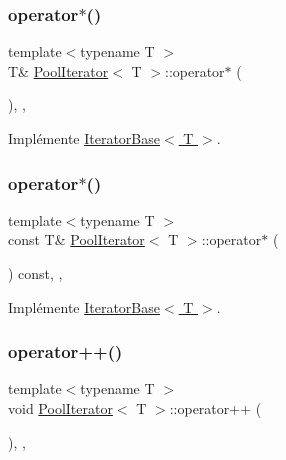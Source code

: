 \subsubsection{\texorpdfstring{operator$\ast$()}{operator*()}\hspace{0.1cm}{\footnotesize\ttfamily [1/2]}}
{\footnotesize\ttfamily template$<$typename T $>$ \\
T\& \hyperlink{class_pool_iterator}{Pool\+Iterator}$<$ T $>$\+::operator$\ast$ (\begin{DoxyParamCaption}{ }\end{DoxyParamCaption})\hspace{0.3cm}{\ttfamily [inline]}, {\ttfamily [override]}, {\ttfamily [virtual]}}



Implémente \hyperlink{class_iterator_base_a532583e58bce168648bdbdedb3a7d5ab}{Iterator\+Base$<$ T $>$}.

\mbox{\label{class_pool_iterator_ab8a7e0669bfd1cd4335ca726bba77127}} 
\subsubsection{\texorpdfstring{operator$\ast$()}{operator*()}\hspace{0.1cm}{\footnotesize\ttfamily [2/2]}}
{\footnotesize\ttfamily template$<$typename T $>$ \\
const T\& \hyperlink{class_pool_iterator}{Pool\+Iterator}$<$ T $>$\+::operator$\ast$ (\begin{DoxyParamCaption}{ }\end{DoxyParamCaption}) const\hspace{0.3cm}{\ttfamily [inline]}, {\ttfamily [override]}, {\ttfamily [virtual]}}



Implémente \hyperlink{class_iterator_base_abc219468b68f2b5471494d04d00f6ec7}{Iterator\+Base$<$ T $>$}.

\mbox{\label{class_pool_iterator_a0da86ab88d60973aee45e6a51a929138}} 
\subsubsection{\texorpdfstring{operator++()}{operator++()}}
{\footnotesize\ttfamily template$<$typename T $>$ \\
void \hyperlink{class_pool_iterator}{Pool\+Iterator}$<$ T $>$\+::operator++ (\begin{DoxyParamCaption}{ }\end{DoxyParamCaption})\hspace{0.3cm}{\ttfamily [inline]}, {\ttfamily [override]}, {\ttfamily [virtual]}}



